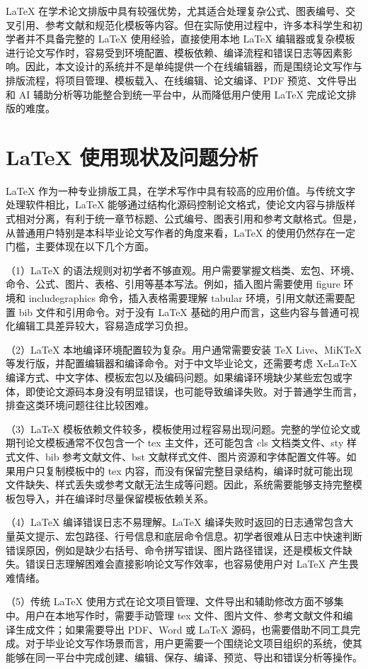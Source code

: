 \documentclass{xduugthesis}
\begin{document}
LaTeX 在学术论文排版中具有较强优势，尤其适合处理复杂公式、图表编号、交叉引用、参考文献和规范化模板等内容。但在实际使用过程中，许多本科学生和初学者并不具备完整的 LaTeX 使用经验，直接使用本地 LaTeX 编辑器或复杂模板进行论文写作时，容易受到环境配置、模板依赖、编译流程和错误日志等因素影响。因此，本文设计的系统并不是单纯提供一个在线编辑器，而是围绕论文写作与排版流程，将项目管理、模板载入、在线编辑、论文编译、PDF 预览、文件导出和 AI 辅助分析等功能整合到统一平台中，从而降低用户使用 LaTeX 完成论文排版的难度。

\section{LaTeX 使用现状及问题分析}
LaTeX 作为一种专业排版工具，在学术写作中具有较高的应用价值。与传统文字处理软件相比，LaTeX 能够通过结构化源码控制论文格式，使论文内容与排版样式相对分离，有利于统一章节标题、公式编号、图表引用和参考文献格式。但是，从普通用户特别是本科毕业论文写作者的角度来看，LaTeX 的使用仍然存在一定门槛，主要体现在以下几个方面。

（1）LaTeX 的语法规则对初学者不够直观。用户需要掌握文档类、宏包、环境、命令、公式、图片、表格、引用等基本写法。例如，插入图片需要使用 figure 环境和 includegraphics 命令，插入表格需要理解 tabular 环境，引用文献还需要配置 bib 文件和引用命令。对于没有 LaTeX 基础的用户而言，这些内容与普通可视化编辑工具差异较大，容易造成学习负担。

（2）LaTeX 本地编译环境配置较为复杂。用户通常需要安装 TeX Live、MiKTeX 等发行版，并配置编辑器和编译命令。对于中文毕业论文，还需要考虑 XeLaTeX 编译方式、中文字体、模板宏包以及编码问题。如果编译环境缺少某些宏包或字体，即使论文源码本身没有明显错误，也可能导致编译失败。对于普通学生而言，排查这类环境问题往往比较困难。

（3）LaTeX 模板依赖文件较多，模板使用过程容易出现问题。完整的学位论文或期刊论文模板通常不仅包含一个 tex 主文件，还可能包含 cls 文档类文件、sty 样式文件、bib 参考文献文件、bst 文献样式文件、图片资源和字体配置文件等。如果用户只复制模板中的 tex 内容，而没有保留完整目录结构，编译时就可能出现文件缺失、样式丢失或参考文献无法生成等问题。因此，系统需要能够支持完整模板包导入，并在编译时尽量保留模板依赖关系。

（4）LaTeX 编译错误日志不易理解。LaTeX 编译失败时返回的日志通常包含大量英文提示、宏包路径、行号信息和底层命令信息。初学者很难从日志中快速判断错误原因，例如是缺少右括号、命令拼写错误、图片路径错误，还是模板文件缺失。错误日志理解困难会直接影响论文写作效率，也容易使用户对 LaTeX 产生畏难情绪。

（5）传统 LaTeX 使用方式在论文项目管理、文件导出和辅助修改方面不够集中。用户在本地写作时，需要手动管理 tex 文件、图片文件、参考文献文件和编译生成文件；如果需要导出 PDF、Word 或 LaTeX 源码，也需要借助不同工具完成。对于毕业论文写作场景而言，用户更需要一个围绕论文项目组织的系统，使其能够在同一平台中完成创建、编辑、保存、编译、预览、导出和错误分析等操作。
\end{document}
